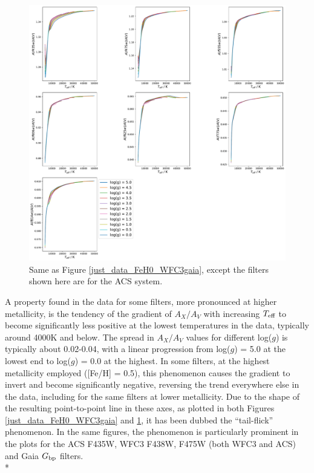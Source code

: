 \documentclass[12pt, a4paper]{report}
\begin{document}
\begin{figure}[h!]
\begin{center}
\includegraphics[width=1.0\textwidth]{../just_full_data/ACS/AHub_FeH0p0_just_Teff_plot_lines.pdf}
\caption{Same as Figure \ref{just_data_FeH0_WFC3gaia}, except the filters shown here are for the ACS system.}
\label{just_data_FeH0_ACS}
\end{center}
\end{figure}

A property found in the data for some filters, more pronounced at higher metallicity, is the tendency of the gradient of $A_{X}/A_{V}$ with increasing $T_{\textnormal{eff}}$ to become significantly less positive at the lowest temperatures in the data, typically around 4000K and below. The spread in $A_{X}/A_{V}$ values for different log($g$) is typically about 0.02-0.04, with a linear progression from log($g$) = 5.0 at the lowest end to log($g$) = 0.0 at the highest. In some filters, at the highest metallicity employed ([Fe/H] = 0.5), this phenomenon causes the gradient to invert and become significantly negative, reversing the trend everywhere else in the data, including for the same filters at lower metallicity. Due to the shape of the resulting point-to-point line in these axes, as plotted in both Figures \ref{just_data_FeH0_WFC3gaia} and \ref{just_data_FeH0_ACS}, it has been dubbed the ``tail-flick'' phenomenon. In the same figures, the phenomenon is particularly prominent in the plots for the ACS F435W, WFC3 F438W, F475W (both WFC3 and ACS) and Gaia $G_{\textnormal{bp}}$ filters.\\*
\end{document}
